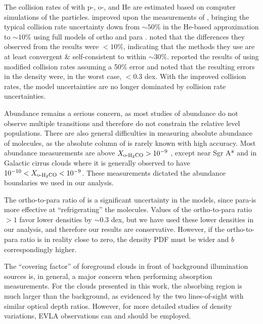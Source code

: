 The collision rates of \formaldehyde with p-\hh, o-\hh, and He are estimated
based on computer simulations of the particles.  \citet{Troscompt2009a}
improved upon the measurements of \citet{Green1991a}, bringing the typical
collision rate uncertainty down from $\sim50\%$ in the He-based approximation
to $\sim10\%$ using full models of ortho and para \hh.  \citet{Wiesenfeld2013a}
noted that the differences they observed from the \citet{Troscompt2009a} results
were $<10\%$, indicating that the methods they use are at least convergent \&
self-consistent to within $\sim30\%$.
\citet{Zeiger2010a}
reported the results of using modified collision rates assuming a 50\% error
and noted that the resulting errors in the \hh density were, in the worst case,
$<0.3$ dex.  With the improved \citet{Troscompt2009a} collision rates, the
model uncertainties are no longer dominated by collision rate uncertainties.

Abundance remains a serious concern, as most studies of \ortho abundance
do not observe multiple transitions and therefore do not constrain the relative
level populations.  There
are also general difficulties in measuring absolute abundance of molecules, as
the absolute column of \hh is rarely known with high accuracy.  Most abundance
measurements are above $X_{\textrm{o-H}_2\textrm{CO}}>10^{-9}$
\citep{Dickens1999a,Liszt2006a}, 
except near Sgr A* \citep{Pauls1996a} and in Galactic cirrus clouds
\citep{Turner1989a,Turner1993a} where it is generally observed to have
$10^{-10}<X_{\textrm{o-H}_2\textrm{CO}}<10^{-9}$.  These measurements dictated the abundance
boundaries we used in our analysis.

The ortho-to-para ratio of \hh is a significant uncertainty in the models,
since para-\hh is more effective at ``refrigerating'' the \formaldehyde
molecules.  Values of the ortho-to-para ratio $>1$ favor lower densities by
$\sim0.3$ dex, but we have used these lower densities in our
analysis, and therefore our results are conservative.  However, if the
ortho-to-para ratio is in reality close to zero, the density PDF must be wider
and $b$ correspondingly higher.

The ``covering factor'' of foreground clouds in front of background
illumination sources is, in general, a major concern when performing absorption
measurements.  For the clouds presented in this work, the absorbing region
is much larger than the background, as evidenced by the two lines-of-sight with
similar optical depth ratios.  However, for more detailed studies of density
variations, EVLA observations can and should be employed.

